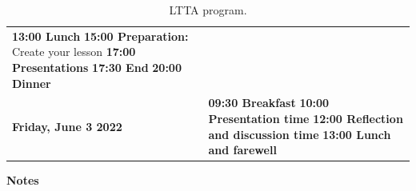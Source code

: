 \documentclass[11pt]{article}
\begin{document}
\begin{table}
\begin{center}
\begin{tabular}{m{6cm} m{8cm}}
        \newline \textbf{13:00 Lunch} \newline
        \textbf{15:00 Preparation:} Create your lesson
        \newline
        \textbf{17:00 Presentations} \newline
        \textbf{17:30 End} \newline
        \textbf{20:00 Dinner} \\
        \rowcolor{gray!15}
        \centering\textbf{Friday, June 3 2022} &
        \textbf{09:30 Breakfast} \newline 
        \textbf{10:00 Presentation time} \newline 
        \textbf{12:00 Reflection and discussion time} \newline 
        \textbf{13:00 Lunch and farewell} \\
        \bottomrule%
    \end{tabular}
      \caption[LTTA program]{LTTA program.}
      \label{tab:program}
     \end{center}
    \end{table}

    \newpage



\newpage
\begin{center}
\Huge \textbf{Notes}
\end{center}
\end{document}
